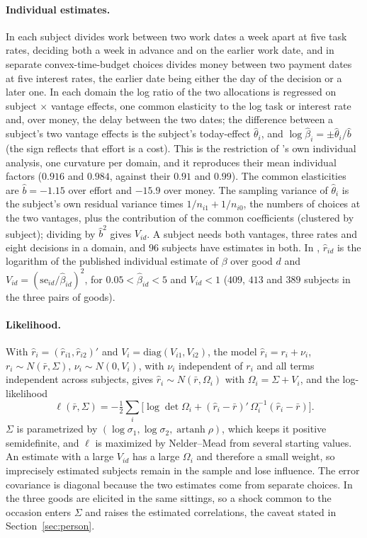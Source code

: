 \documentclass[11pt,a4paper]{article}
\theoremstyle{plain}
\theoremstyle{definition}
\begin{document}
\paragraph{Individual estimates.} In \citet{ans2015} each subject divides work between two work dates a week apart at
five task rates, deciding both a week in advance and on the earlier work date, and in separate convex-time-budget
choices divides money between two payment dates at five interest rates, the earlier date being either the day of the
decision or a later one. In each domain the log ratio of the two allocations is regressed on subject $\times$ vantage
effects, one common elasticity to the log task or interest rate and, over money, the delay between the two dates; the
difference between a subject's two vantage effects is the subject's today-effect $\hat\theta_i$, and
$\log\hat\beta_i=\pm\hat\theta_i/\hat b$ (the sign reflects that effort is a cost). This is the restriction of
\citeauthor{ans2015}'s own individual analysis, one curvature per domain, and it reproduces their mean individual
factors ($0.916$ and $0.984$, against their $0.91$ and $0.99$). The common elasticities are $\hat b=-1.15$ over effort
and $-15.9$ over money. The sampling variance of $\hat\theta_i$ is the subject's own residual variance times
$1/n_{i1}+1/n_{i0}$, the numbers of choices at the two vantages, plus the contribution of the common coefficients
(clustered by subject); dividing by $\hat b^2$ gives $V_{id}$. A subject needs both vantages, three rates and eight
decisions in a domain, and $96$ subjects have estimates in both. In \citet{cheung2022}, $\hat r_{id}$ is the logarithm
of the published individual estimate of $\beta$ over good $d$ and $V_{id}=(\mathrm{se}_{id}/\hat\beta_{id})^2$, for
$0.05<\hat\beta_{id}<5$ and $V_{id}<1$ ($409$, $413$ and $389$ subjects in the three pairs of goods).

\paragraph{Likelihood.} With $\hat r_i=(\hat r_{i1},\hat r_{i2})'$ and $V_i=\mathrm{diag}(V_{i1},V_{i2})$, the model
$\hat r_i=r_i+\nu_i$, $r_i\sim N(\bar r,\Sigma)$, $\nu_i\sim N(0,V_i)$, with $\nu_i$ independent of $r_i$ and all
terms independent across subjects, gives $\hat r_i\sim N(\bar r,\Omega_i)$ with $\Omega_i=\Sigma+V_i$, and the
log-likelihood
\[
\ell(\bar r,\Sigma)=-\tfrac12\sum_{i}\Big[\log\det\Omega_i+(\hat r_i-\bar r)'\,
\Omega_i^{-1}(\hat r_i-\bar r)\Big].
\]
$\Sigma$ is parametrized by $(\log\sigma_1,\log\sigma_2,\operatorname{artanh}\rho)$, which keeps it positive
semidefinite, and $\ell$ is maximized by Nelder--Mead from several starting values. An estimate with a large $V_{id}$
has a large $\Omega_i$ and therefore a small weight, so imprecisely estimated subjects remain in the sample and lose
influence. The error covariance is diagonal because the two estimates come from separate choices. In
\citet{cheung2022} the three goods are elicited in the same sittings, so a shock common to the occasion enters
$\Sigma$ and raises the estimated correlations, the caveat stated in Section~\ref{sec:person}.
\end{document}
